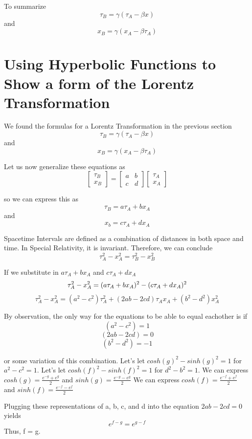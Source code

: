 \documentclass{article}
\begin{document}
To summarize
\[
  \tau_B = \gamma ( \tau_A - \beta x)
\]
and
\[
  x_B = \gamma (x_A - \beta \tau_A)
\]
\newpage
\section{Using Hyperbolic Functions to Show a form of the Lorentz Transformation}
\begin{center}
  We found the formulas for a Lorentz Transformation in the previous section
  \[
    \tau_B = \gamma ( \tau_A - \beta x)
  \]
  and
  \[
    x_B = \gamma (x_A - \beta \tau_A)
  \]
  
  Let us now generalize these equations as
  \[
    \begin{bmatrix} 
      \tau_B \\
      x_B
    \end{bmatrix}
    =
    \begin{bmatrix} 
      a & b \\
      c & d
    \end{bmatrix}
    \begin{bmatrix} 
      \tau_A \\
      x_A
    \end{bmatrix}
  \]
  
  so we can express this as
  \[
    \tau_B = a\tau_A + bx_A
  \]
  and 
  \[
    x_b = c\tau_A + dx_A
  \]
  
  Spacetime Intervals are defined as a combination of distances in both space and time. In Special Relativity, it is invariant. Therefore, we can conclude
  \[
    \tau_A^2 - x_A^2 = \tau_B^2 - x_B^2
  \]
  
  If we substitute in \(a\tau_A + bx_A\) and \(c\tau_A + dx_A\)
  \[
    \tau_A^2 - x_A^2 = (a\tau_A + bx_A)^2 - (c\tau_A + dx_A)^2 \newline
  \]
  \[
    \tau_A^2 - x_A^2 = (a^2 - c^2)\tau_A^2 + (2ab - 2cd)\tau_A x_A + (b^2 - d^2) x_A^2
  \]
  
  By observation, the only way for the equations to be able to equal eachother is if
  \[
    (a^2 - c^2) = 1
  \]
  \[
    (2ab - 2cd) = 0
  \]
  \[
    (b^2 - d^2) = -1
  \]
  
  or some variation of this combination. \newline
  Let's let \(cosh(g)^2 - sinh(g)^2 = 1\) for \(a^2 - c^2 = 1\). \newline
  Let's let \(cosh(f)^2 - sinh(f)^2 = 1\) for \(d^2 - b^2 = 1\). \newline
  We can express \(cosh(g) = \frac{e^{-g} + e^{g}}{2}\) and \(sinh(g) = \frac{e^{-g} - e^{g}}{2}\) \newline
  We can express \(cosh(f) = \frac{e^{-f} + e^{f}}{2}\) and \(sinh(f) = \frac{e^{-f} - e^{f}}{2}\) \newline
  
  Plugging these representations of a, b, c, and d into the equation \(2ab - 2cd = 0\) yields
  \[
    e^{f - g} = e^{g - f}
  \]
  Thus, f = g.
\end{center}
\newpage
\end{document}
